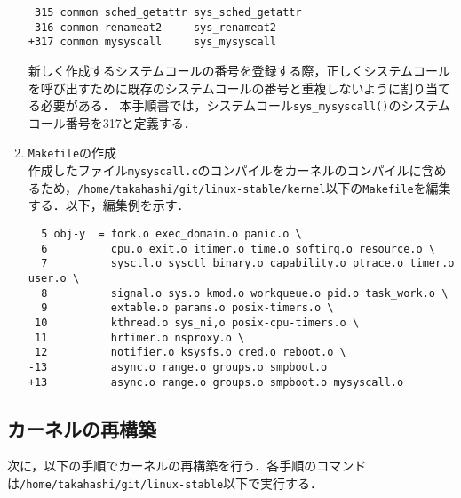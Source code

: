 \documentclass[12pt]{jsarticle}
\begin{document}
\begin{enumerate}
\begin{verbatim}
 315 common sched_getattr sys_sched_getattr
 316 common renameat2     sys_renameat2
+317 common mysyscall     sys_mysyscall
\end{verbatim}
新しく作成するシステムコールの番号を登録する際，正しくシステムコールを呼び出すために既存のシステムコールの番号と重複しないように割り当てる必要がある．
本手順書では，システムコール\verb|sys_mysyscall()|のシステムコール番号を317と定義する．

\item \verb|Makefile|の作成\\
  作成したファイル\verb|mysyscall.c|のコンパイルをカーネルのコンパイルに含めるため，\verb|/home/takahashi/git/linux-stable/kernel|以下の\verb|Makefile|を編集する．以下，編集例を示す．
\begin{verbatim}
  5 obj-y  = fork.o exec_domain.o panic.o \
  6          cpu.o exit.o itimer.o time.o softirq.o resource.o \
  7          sysctl.o sysctl_binary.o capability.o ptrace.o timer.o user.o \
  8          signal.o sys.o kmod.o workqueue.o pid.o task_work.o \
  9          extable.o params.o posix-timers.o \
 10          kthread.o sys_ni,o posix-cpu-timers.o \ 
 11          hrtimer.o nsproxy.o \
 12          notifier.o ksysfs.o cred.o reboot.o \
-13          async.o range.o groups.o smpboot.o 
+13          async.o range.o groups.o smpboot.o mysyscall.o
\end{verbatim}
\end{enumerate}

\subsection{カーネルの再構築}
次に，以下の手順でカーネルの再構築を行う．各手順のコマンドは\verb|/home/takahashi/git/linux-stable|以下で実行する．
\end{document}
